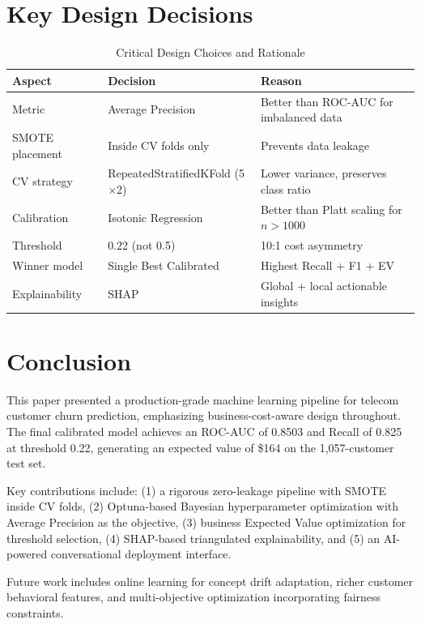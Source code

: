 \documentclass[conference]{IEEEtran}
\begin{document}
\section{Key Design Decisions}

\begin{table}[h]
\centering
\caption{Critical Design Choices and Rationale}
\begin{tabular}{p{2.2cm}p{2.2cm}p{3.0cm}}
\toprule
\textbf{Aspect} & \textbf{Decision} & \textbf{Reason} \\
\midrule
Metric & Average Precision & Better than ROC-AUC for imbalanced data \\
SMOTE placement & Inside CV folds only & Prevents data leakage \\
CV strategy & RepeatedStratifiedKFold (5$\times$2) & Lower variance, preserves class ratio \\
Calibration & Isotonic Regression & Better than Platt scaling for $n>1000$ \\
Threshold & 0.22 (not 0.5) & 10:1 cost asymmetry \\
Winner model & Single Best Calibrated & Highest Recall + F1 + EV \\
Explainability & SHAP & Global + local actionable insights \\
\bottomrule
\end{tabular}
\end{table}

\section{Conclusion}

This paper presented a production-grade machine learning pipeline for telecom customer churn prediction, emphasizing business-cost-aware design throughout. The final calibrated model achieves an ROC-AUC of 0.8503 and Recall of 0.825 at threshold 0.22, generating an expected value of \$164 on the 1,057-customer test set.

Key contributions include: (1) a rigorous zero-leakage pipeline with SMOTE inside CV folds, (2) Optuna-based Bayesian hyperparameter optimization with Average Precision as the objective, (3) business Expected Value optimization for threshold selection, (4) SHAP-based triangulated explainability, and (5) an AI-powered conversational deployment interface.

Future work includes online learning for concept drift adaptation, richer customer behavioral features, and multi-objective optimization incorporating fairness constraints.
\end{document}
